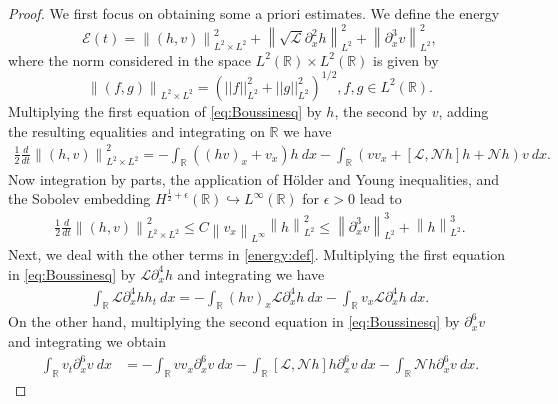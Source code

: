 \documentclass[final,11pt,a4paper,reqno]{amsart}
\newcommand{\norm}[1]{\left\| #1 \right\|}
\newcommand{\RR}{\mathbb R}
\newcommand{\pa}{\partial}
\theoremstyle{definition}
\begin{document}
\begin{proof}
We first focus on obtaining some a priori estimates.
We define the energy
\begin{equation}\label{energy:def}
\mathcal{E}(t)=\norm{(h,v)}_{L^{2}\times L^2}^{2} 	+\norm{\sqrt{\mathscr{L}}\pa_{x}^{2}h}_{L^{2}}^{2}+ \norm{\pa_{x}^{3}v}_{L^{2}}^{2},
\end{equation}
where the norm considered in the space $L^{2}(\mathbb{R})\times L^{2}(\mathbb{R})$ is given by
$$\norm{(f,g)}_{L^{2}\times L^2}=\left(||f||_{L^{2}}^{2}+||g||_{L^{2}}^{2}\right)^{1/2}, f,g\in L^{2}(\mathbb{R}).$$
Multiplying the first equation of \eqref{eq:Boussinesq} by $h$, the second by $v$, adding the resulting equalities and integrating on $\mathbb{R}$ we have
\begin{align*}
\frac{1}{2}\frac{d}{dt}\norm{(h,v)}_{L^{2}\times L^2}^{2}=-\int_{\RR} \left((hv)_{x}+v_{x}\right) h \  dx- \int_{\RR} \left(vv_{x}+[\mathscr{L}, \mathscr{N}h]h+\mathscr{N}h \right) v \  dx.
\end{align*}
Now integration by parts, the application of H\"older and Young  inequalities, and the Sobolev embedding $H^{\frac{1}{2}+\epsilon}(\RR)\hookrightarrow L^{\infty}(\RR)$ for $\epsilon>0$ lead to 
\begin{align}\label{L2:estimate:system3}
\frac{1}{2}\frac{d}{dt}\norm{(h,v)}_{L^{2}\times L^2}^{2}\leq C \norm{v_x}_{L^{\infty}}\norm{h}^{2}_{L^{2}} \leq \norm{\pa_{x}^{3}v}^{3}_{L^2}+\norm{h}_{L^{2}}^{3}.
\end{align}
Next, we deal with the other terms in \eqref{energy:def}. Multiplying the first equation in \eqref{eq:Boussinesq} by $ \mathscr{L}\partial_{x}^{4}h$ and integrating we have 
\begin{align}\label{eq:Lh}
\int_{\RR} \mathscr{L}\pa_{x}^{4}h h_{t} \  dx=-\int_{\RR}(hv)_{x} \mathscr{L}\pa_{x}^{4}h \ dx - \int_{\RR} v_{x} \mathscr{L}\pa_{x}^{4}h \  dx.
\end{align}
On the other hand, multiplying the second equation in  \eqref{eq:Boussinesq} by $\pa_{x}^{6}v$ and integrating we obtain
\begin{align}\label{eq:H3v}
\int_{\RR} v_{t} \pa_{x}^{6}v\  dx &=-\int_{\RR}vv_{x} \pa_{x}^{6}v \ dx - \int_{\RR}[\mathscr{L}, \mathscr{N}h] h \pa_{x}^{6}v  \ dx - \int_{\RR} \mathscr{N}h \pa_{x}^{6} v \  dx .

\end{align}
\end{proof}
\end{document}
